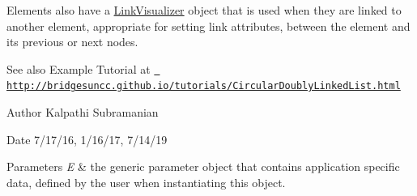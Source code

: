 Elements also have a \mbox{\hyperlink{classbridges_1_1base_1_1_link_visualizer}{Link\+Visualizer}} object that is used when they are linked to another element, appropriate for setting link attributes, between the element and its previous or next nodes.

\begin{DoxySeeAlso}{See also}
Example Tutorial at \href{http://bridgesuncc.github.io/tutorials/CircularDoublyLinkedList.html}{\texttt{ http\+://bridgesuncc.\+github.\+io/tutorials/\+Circular\+Doubly\+Linked\+List.\+html}}
\end{DoxySeeAlso}
\begin{DoxyAuthor}{Author}
Kalpathi Subramanian
\end{DoxyAuthor}
\begin{DoxyDate}{Date}
7/17/16, 1/16/17, 7/14/19
\end{DoxyDate}

\begin{DoxyParams}{Parameters}
{\em E} & the generic parameter object that contains application specific data, defined by the user when instantiating this object. \\
\hline
\end{DoxyParams}

